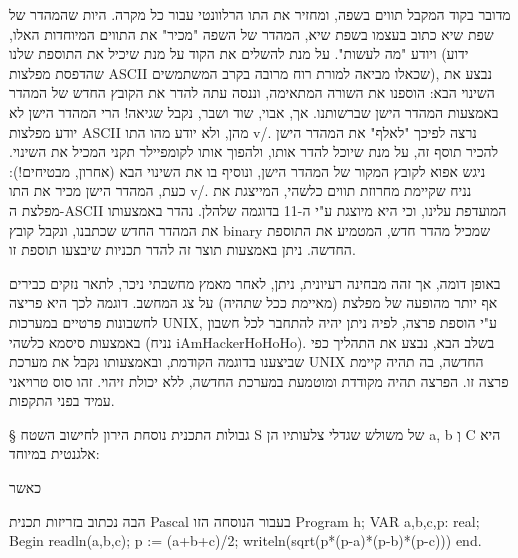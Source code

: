 מדובר בקוד המקבל תווים בשפה, ומחזיר את התו הרלוונטי עבור כל מקרה. היות שהמהדר של שפת שיא כתוב בעצמו בשפת שיא, המהדר של השפה "מכיר" את התווים המיוחדות האלו, ויודע "מה לעשות".
על מנת להשלים את הקוד על מנת שיכיל את התוספת שלנו (ידוע שהדפסת מפלצות ASCII שכאלו מביאה למורת רוח מרובה בקרב המשתמשים), נבצע את השינוי הבא:
הוספנו את השורה המתאימה, וננסה עתה להדר את הקובץ החדש של המהדר באמצעות המהדר הישן שברשותנו. אך, אבוי, שוד ושבר, נקבל שגיאה! הרי המהדר הישן לא יודע מפלצות ASCII מהן, ולא יודע מהו התו v/.
נרצה לפיכך "לאלף" את המהדר הישן להכיר תוסף זה, על מנת שיוכל להדר אותו, ולהפוך אותו לקומפיילר תקני המכיל את השינוי. ניגש אפוא לקובץ המקור של המהדר הישן, ונוסיף בו את השינוי הבא (אחרון, מבטיחים!):
כעת, המהדר הישן מכיר את התו v/. נניח שקיימת מחרוזת תווים כלשהי, המייצגת את מפלצת ה-ASCII המועדפת עלינו, וכי היא מיוצגת ע"י ה-11 בדוגמה שלהלן. נהדר באמצעותו את המהדר החדש שכתבנו, ונקבל קובץ binary שמכיל מהדר חדש, המטמיע את התוספת החדשה. ניתן באמצעות תוצר זה להדר תכניות שיבצעו תוספת זו.
    
    באופן דומה, אך זהה מבחינה רעיונית, ניתן, לאחר מאמץ מחשבתי ניכר, לתאר נזקים
כבירים אף יותר מהופעה של מפלצת (מאיימת ככל שתהיה) על צג המחשב. דוגמה לכך היא
פריצה לחשבונות פרטיים במערכות UNIX, ע"י הוספת פרצה, לפיה ניתן יהיה להתחבר לכל
חשבון באמצעות סיסמא כלשהי (נניח iAmHackerHoHoHo). בשלב הבא, נבצע את התהליך כפי
שביצענו בדוגמה הקודמת, ובאמצעותו נקבל את מערכת UNIX החדשה, בה תהיה קיימת פרצה
זו. הפרצה תהיה מקודדת ומוטמעת במערכת החדשה, ללא יכולת זיהוי. זהו סוס טרויאני
עמיד בפני התקפות.

§ גבולות התכנית
נוסחת הירון לחישוב השטח S של משולש שגדלי צלעותיו הן a, b וְ C היא אלגנטית במיוחד:

כאשר

הבה נכתוב בזריזות תכנית Pascal בעבור הנוסחה הזו
Program h;
VAR a,b,c,p: real;
Begin
readln(a,b,c);
p := (a+b+c)/2;
writeln(sqrt(p*(p-a)*(p-b)*(p-c)))
end.


